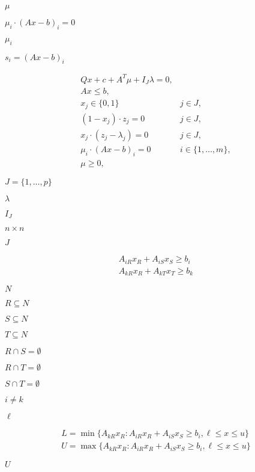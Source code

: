 \documentclass{article}
\begin{document}
$\mu$
\pagebreak

$\mu_i \cdot (Ax - b)_i = 0$
\pagebreak

$\mu_i$
\pagebreak

$s_i = (Ax - b)_i$
\pagebreak

\[
 \begin{array}{ll}
  Q x + c + A^T \mu + I_J \lambda = 0,\\
  Ax \leq b,\\
  x_j \in \{0,1\}                    & j \in J,\\
  (1 - x_j) \cdot z_j = 0            & j \in J,\\
  x_j \cdot (z_j - \lambda_j) = 0    & j \in J,\\
  \mu_i \cdot (Ax - b)_i = 0         & i \in \{1, \dots, m\},\\
  \mu \geq 0,
\end{array}
\]
\pagebreak

$J = \{1,\dots, p\}$
\pagebreak

$\lambda$
\pagebreak

$I_J$
\pagebreak

$n\times n$
\pagebreak

$J$
\pagebreak

\begin{eqnarray*}
  A_{iR} x_R + A_{iS} x_S              \geq b_i\\
  A_{kR} x_R              + A_{kT} x_T \geq b_k
\end{eqnarray*}
\pagebreak

$N$
\pagebreak

$R \subseteq N$
\pagebreak

$S \subseteq N$
\pagebreak

$T \subseteq N$
\pagebreak

$R \cap S = \emptyset$
\pagebreak

$R \cap T = \emptyset$
\pagebreak

$S \cap T = \emptyset$
\pagebreak

$i \not= k$
\pagebreak

$\ell$
\pagebreak

\begin{eqnarray*}
  L = \min \{ A_{kR} x_R : A_{iR} x_R + A_{iS} x_S \geq b_i, \ell \leq x \leq u \}\\
  U = \max \{ A_{kR} x_R : A_{iR} x_R + A_{iS} x_S \geq b_i, \ell \leq x \leq u \}
\end{eqnarray*}
\pagebreak

$U$
\pagebreak
\end{document}
